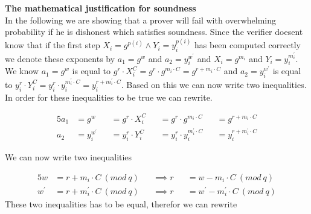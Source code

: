 \noindent
\textbf{The mathematical justification for soundness}\\
In the following we are showing that a prover will fail with overwhelming probability if he is dishonest which satisfies soundness. Since the verifier doesent know that if the first step \begin{math}X_i=g^{p(i)}  \land Y_i=y_i^{p(i)} \end{math} has been computed correctly we denote these exponents by \begin{math}a_1=g^w\end{math}    and \begin{math}a_2=y_i^{w^{'}}\end{math} and \begin{math}X_i=g^{m_i}\end{math}    and \begin{math}Y_i=y_i^{m_i^{'}}\end{math}. We know \begin{math} a_1= g^w \end{math} is equal to \begin{math}g^r  \cdot  X_i^C=g^r \cdot g^{m_i \cdot C} = g^{r+m_i \cdot C}\end{math} and \begin{math} a_2= y_i^{w^{'}}\end{math} is equal to \begin{math}y_i^r  \cdot  Y_i^C=y_i^r \cdot y_i^{m_i^{'} \cdot C} = y_i^{r+m_i^{'} \cdot C}\end{math}. Based on this we can now write two inequalities. In order for these inequalities to be true we can rewrite.

\begin{alignat*}{5}
 a_1 &= g^w &&= g^r  \cdot  X_i^C &&=g^r \cdot g^{m_i \cdot C} &&= g^{r+m_i \cdot C}\\
 a_2 &= y_i^{w^{'}} &&= y_i^r  \cdot  Y_i^C &&=y_i^r \cdot y_i^{m_i^{'} \cdot C} &&= y_i^{r+m_i^{'} \cdot C}
\end{alignat*}

\noindent
We can now write two inequalities

\begin{alignat*}{5}
 w &= r+m_i  \cdot  C\ (mod\ q) &&\implies r &&= w-m_i \cdot C\ (mod\ q)\\
 w^{'} &= r+m_i^{'}  \cdot  C\ (mod\ q) &&\implies r &&= w^{'}-m_i^{'}  \cdot  C\ (mod\ q)
\end{alignat*}
\noindent
These two inequalities has to be equal, therefor we can rewrite

